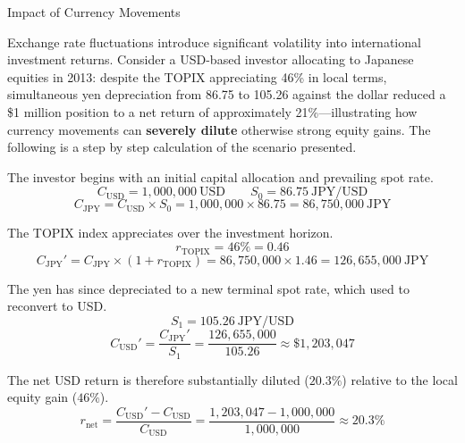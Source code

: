 \documentclass[10pt]{article}
\begin{document}
  \begin{core}{Impact of Currency Movements}

    Exchange rate fluctuations introduce significant volatility into international investment returns. Consider a USD-based investor allocating to Japanese equities in 2013: despite the TOPIX appreciating 46\% in local terms, simultaneous yen depreciation from 86.75 to 105.26 against the dollar reduced a \$1 million position to a net return of approximately 21\%---illustrating how currency movements can \textbf{severely dilute} otherwise strong equity gains. The following is a step by step calculation of the scenario presented.

    The investor begins with an initial capital allocation and prevailing spot rate.
    \[
      C_{\text{USD}} = 1{,}000{,}000 \ \text{USD} \qquad S_0 = 86.75 \ \text{JPY/USD}
    \]
    \[
      C_{\text{JPY}} = C_{\text{USD}} \times S_0 = 1{,}000{,}000 \times 86.75 = 86{,}750{,}000 \ \text{JPY}
    \]

    The TOPIX index appreciates over the investment horizon.
    \[
      r_{\text{TOPIX}} = 46\% = 0.46
    \]
    \[
      C_{\text{JPY}}' = C_{\text{JPY}} \times (1 + r_{\text{TOPIX}}) = 86{,}750{,}000 \times 1.46 = 126{,}655{,}000 \ \text{JPY}
    \]

    The yen has since depreciated to a new terminal spot rate, which used to reconvert to USD.
    \[
      S_1 = 105.26 \ \text{JPY/USD}
    \]
    \[
      C_{\text{USD}}' = \frac{C_{\text{JPY}}'}{S_1} = \frac{126{,}655{,}000}{105.26} \approx \$1{,}203{,}047
    \]

    The net USD return is therefore substantially diluted ($20.3\%$) relative to the local equity gain ($46\%$).
    \[
      r_{\text{net}} = \frac{C_{\text{USD}}' - C_{\text{USD}}}{C_{\text{USD}}} = \frac{1{,}203{,}047 - 1{,}000{,}000}{1{,}000{,}000} \approx 20.3\%
    \]

  \end{core}
\end{document}
